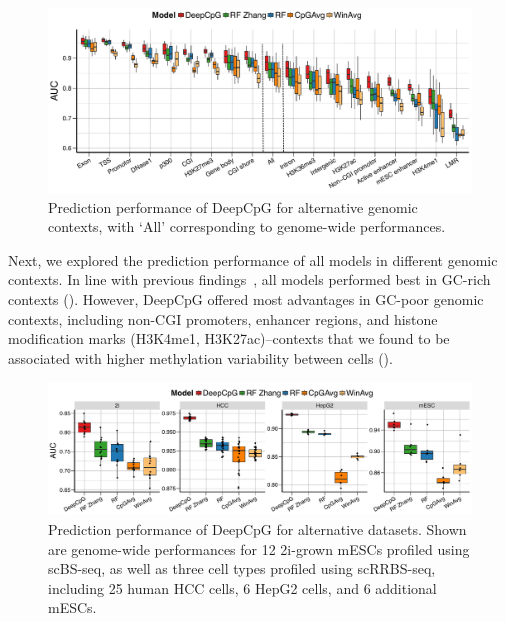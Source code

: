 \begin{figure}[htbp!]
\centering
\includegraphics[width=1.0\textwidth]{eval_annos}
\caption[Prediction performance of DeepCpG for alternative genomic contexts.]{Prediction performance of DeepCpG for alternative genomic contexts, with `All' corresponding to genome-wide performances.}
\label{fig:dcpg_eval_annos}
\end{figure}

Next, we explored the prediction performance of all models in different genomic contexts. In line with previous findings~\citep{stevens_estimating_2013,zhang_predicting_2015}, all models performed best in GC-rich contexts (). However, DeepCpG offered most advantages in GC-poor genomic contexts, including non-CGI promoters, enhancer regions, and histone modification marks (H3K4me1, H3K27ac)--contexts that we found to be associated with higher methylation variability between cells ().

\begin{figure}[htbp!]
\centering
\includegraphics[width=1.0\textwidth]{eval_dsets}
\caption[Prediction performance of DeepCpG for alternative datasets.]{Prediction performance of DeepCpG for alternative datasets. Shown are genome-wide performances for 12 2i-grown mESCs profiled using scBS-seq, as well as three cell types profiled using scRRBS-seq, including 25 human HCC cells, 6 HepG2 cells, and 6 additional mESCs.}
\label{fig:dcpg_eval_dsets}
\end{figure}

